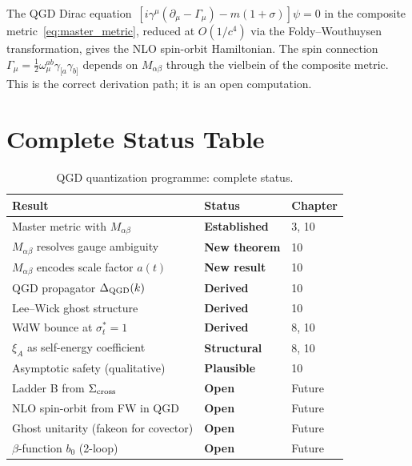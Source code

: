\documentclass[11pt,a4paper]{article}
\theoremstyle{plain}
\theoremstyle{definition}
\theoremstyle{remark}
\newcommand{\half}{\tfrac{1}{2}}
\newcommand{\xiA}{\xi_A}
\newcommand{\sigt}{\sigma_t}
\begin{document}
The QGD Dirac equation~$[i\gamma^\mu(\partial_\mu-\Gamma_\mu)-m(1+\sigma)]\psi=0$
in the composite metric~\eqref{eq:master_metric}, reduced at $O(1/c^4)$
via the Foldy--Wouthuysen transformation, gives the NLO spin-orbit
Hamiltonian.  The spin connection
$\Gamma_\mu=\half\omega_\mu^{ab}\gamma_{[a}\gamma_{b]}$
depends on $M_{\alpha\beta}$ through the vielbein of the composite metric.
This is the correct derivation path; it is an open computation.

\section{Complete Status Table}
\label{sec:status}

\begin{table}[h]
\centering\small\renewcommand{\arraystretch}{1.3}
\caption{QGD quantization programme: complete status.}
\begin{tabular}{@{}p{6.5cm}p{2.8cm}p{3.5cm}@{}}
\toprule
Result & Status & Chapter \\
\midrule
\rowcolor{lightgray}
Master metric with $M_{\alpha\beta}$ &
  \textcolor{confirmed}{\textbf{Established}} & 3, 10 \\
$M_{\alpha\beta}$ resolves gauge ambiguity &
  \textcolor{confirmed}{\textbf{New theorem}} & 10 \\
\rowcolor{lightgray}
$M_{\alpha\beta}$ encodes scale factor $a(t)$ &
  \textcolor{confirmed}{\textbf{New result}} & 10 \\
QGD propagator $\Delta_{\rm QGD}(k)$ &
  \textcolor{confirmed}{\textbf{Derived}} & 10 \\
\rowcolor{lightgray}
Lee--Wick ghost structure &
  \textcolor{confirmed}{\textbf{Derived}} & 10 \\
WdW bounce at $\sigt^*=1$ &
  \textcolor{confirmed}{\textbf{Derived}} & 8, 10 \\
\rowcolor{lightgray}
$\xiA$ as self-energy coefficient &
  \textcolor{predicted}{\textbf{Structural}} & 8, 10 \\
Asymptotic safety (qualitative) &
  \textcolor{predicted}{\textbf{Plausible}} & 10 \\
\midrule
\rowcolor{lightgray}
Ladder B from $\Sigma_{\rm cross}$ &
  \textcolor{open}{\textbf{Open}} & Future \\
NLO spin-orbit from FW in QGD &
  \textcolor{open}{\textbf{Open}} & Future \\
\rowcolor{lightgray}
Ghost unitarity (fakeon for covector) &
  \textcolor{open}{\textbf{Open}} & Future \\
$\beta$-function $b_0$ (2-loop) &
  \textcolor{open}{\textbf{Open}} & Future \\
\bottomrule
\end{tabular}
\end{table}
\end{document}
